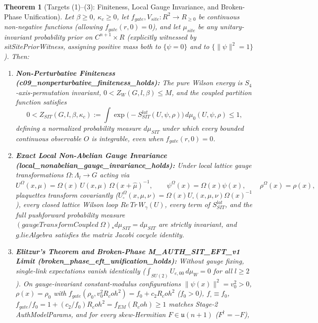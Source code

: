 \documentclass[american,11pt,letterpaper]{article}
\newtheorem{theorem}{Theorem}[section]
\newcommand{\Rcoh}{R_{\mathrm{coh}}}
\def\mathbb#1{#1}%
\def\mathrm#1{#1}%
\def\texttt#1{#1}%
\def\Rcoh{R_coh}%
\begin{document}
\begin{theorem}[Targets (1)--(3): Finiteness, Local Gauge Invariance, and Broken-Phase Unification]
\label{thm:stage4_targets_1_to_3}
Let $\beta \ge 0$, $\kappa_c \ge 0$, let $f_{\mathrm{gate}}, V_{\mathrm{site}} : \mathbb{R}^2 \to \mathbb{R}_{\ge 0}$ be continuous non-negative functions (allowing $f_{\mathrm{gate}}(r,0) = 0$), and let $\mu_{\mathrm{site}}$ be any unitary-invariant probability prior on $\mathbb{C}^{n+1}\times\mathbb{R}$ (explicitly witnessed by \texttt{sitSitePriorWitness}, assigning positive mass both to $\{\psi = 0\}$ and to $\{\|\psi\|^2 = 1\}$). Then:
\begin{enumerate}[leftmargin=2em]
  \item \textbf{Non-Perturbative Finiteness (\texttt{c09\_\allowbreak{}nonperturbative\_\allowbreak{}finiteness\_\allowbreak{}holds}):} The pure Wilson energy is $S_4$-axis-permutation invariant, $0 < Z_W(G,l,\beta) \le M$, and the coupled partition function satisfies
  \begin{equation}
  0 < Z_{\mathrm{SIT}}(G,l,\beta,\kappa_c) := \int \exp\bigl(-S_{\mathrm{SIT}}^{\mathrm{lat}}(U,\psi,\rho)\bigr)\,d\mu_0(U,\psi,\rho) \le 1,
  \end{equation}
  defining a normalized probability measure $d\mu_{\mathrm{SIT}}$ under which every bounded continuous observable $O$ is integrable, even when $f_{\mathrm{gate}}(r,0) = 0$.
  \item \textbf{Exact Local Non-Abelian Gauge Invariance (\texttt{local\_\allowbreak{}nonabelian\_\allowbreak{}gauge\_\allowbreak{}invariance\_\allowbreak{}holds}):} Under local lattice gauge transformations $\Omega : \Lambda_l \to G$ acting via
  \[
  U^\Omega(x,\mu) = \Omega(x)\,U(x,\mu)\,\Omega(x+\hat{\mu})^{-1}, \qquad
  \psi^\Omega(x) = \Omega(x)\psi(x), \qquad
  \rho^\Omega(x) = \rho(x),
  \]
  plaquettes transform covariantly ($U_\square^\Omega(x,\mu,\nu) = \Omega(x)U_\square(x,\mu,\nu)\Omega(x)^{-1}$), every closed lattice Wilson loop $\mathrm{Re}\,\mathrm{Tr}\,W_\gamma(U)$, every term of $S_{\mathrm{SIT}}^{\mathrm{lat}}$, and the full pushforward probability measure $(\mathrm{gaugeTransformCoupled}\;\Omega)_* d\mu_{\mathrm{SIT}} = d\mu_{\mathrm{SIT}}$ are strictly invariant, and $g.\mathrm{lieAlgebra}$ satisfies the matrix Jacobi cocycle identity.
  \item \textbf{Elitzur's Theorem and Broken-Phase \texttt{M\_AUTH\_SIT\_EFT\_v1} Limit (\texttt{broken\_\allowbreak{}phase\_\allowbreak{}eft\_\allowbreak{}unification\_\allowbreak{}holds}):} Without gauge fixing, single-link expectations vanish identically ($\int_{SU(2)} U_{e,00}\,d\mu_W = 0$ for all $l \ge 2$). On gauge-invariant constant-modulus configurations $\|\psi(x)\|^2 = v_0^2 > 0$, $\rho(x) = \rho_0$ with $f_{\mathrm{gate}}(\rho_0, v_0^2\Rcoh^2) = f_0 + c_2\Rcoh^2$ ($f_0 > 0$), $f_\square \equiv f_0$, $f_{\mathrm{gate}}/f_0 = 1 + (c_2/f_0)\Rcoh^2 = f_{\mathrm{EM}}(\Rcoh) \ge 1$ matches Stage-2 \texttt{AuthModelParams}, and for every skew-Hermitian $F \in \mathfrak{u}(n+1)$ ($F^\dagger = -F$),

\end{enumerate}
\end{theorem}
\end{document}
